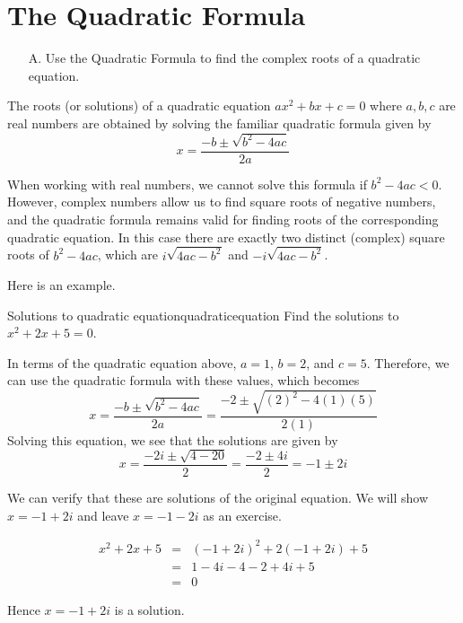 \section{The Quadratic Formula}

\begin{outcome}
\begin{enumerate}
\item[A.] Use the Quadratic Formula to find the complex roots of a quadratic equation. 
\end{enumerate}
\end{outcome}

The roots (or solutions) of a quadratic equation $ax^{2}+bx+c=0$ where $a,b,c$ are real numbers are
obtained by solving the familiar quadratic formula
given by 
\begin{equation*}
x=
\frac{-b\pm \sqrt{b^{2}-4ac}}{2a}
\end{equation*}

When working with real numbers, we cannot solve this formula if
$b^{2}-4ac<0.$ However, complex numbers allow us to find square roots
of negative numbers, and the quadratic formula remains valid for
finding roots of the corresponding quadratic equation.   In this case
there are exactly two distinct (complex) square roots of $b^{2}-4ac$, which are 
$i\sqrt{4ac-b^{2}}$ and $-i\sqrt{4ac-b^{2}}$.

Here is an example. 

\begin{example}{Solutions to quadratic equation}{quadraticequation}
Find the solutions to $x^{2}+2x+5=0$.
\end{example}

\begin{solution}
In terms of the quadratic equation above, $a=1$, $b=2$, and $c=5$.
Therefore, we can use the quadratic formula with these values, which becomes
\begin{equation*}
x=
\frac{-b\pm \sqrt{b^{2}-4ac}}{2a}
= 
\frac{-2 \pm \sqrt{\left(2\right)^{2} - 4 (1)(5)}}{2(1)}
\end{equation*}
Solving this equation, we see that the solutions are given by
\begin{equation*}
x=\frac{-2i\pm \sqrt{4-20}}{2}=\frac{-2\pm 4i}{2}=-1\pm 2i
\end{equation*}

We can verify that these are solutions of the original equation. 
We will show $x = -1+2i$ and leave $x = -1-2i$ as an exercise.

\begin{eqnarray*}
x^{2}+2x+5
&=& (-1+2i)^2 + 2(-1+2i) + 5 \\
&=& 1 - 4i - 4 -2 + 4i + 5 \\
&=& 0
\end{eqnarray*}

Hence $x = -1+2i$ is a solution. 
\end{solution}

